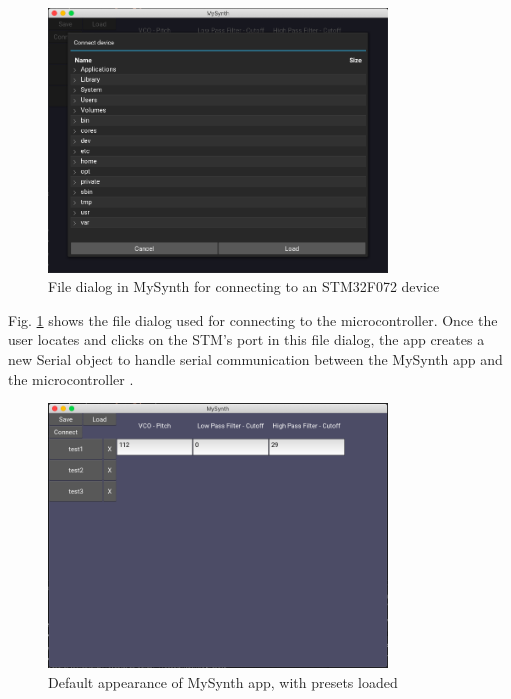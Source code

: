 \documentclass[letterpaper, 12 pt, conference]{ieeeconf}
\begin{document}
\begin{figure}[ht]
\includegraphics[width=9cm]{images/app_file_dialog.png}
\centering
\caption{File dialog in MySynth for connecting to an STM32F072 device}
\label{app_connect}
\end{figure}

Fig. \ref{app_connect} shows the file dialog used for connecting to the microcontroller. Once the user locates and clicks on the STM's port in this file dialog, the app creates a new Serial object to handle serial communication between the MySynth app and the microcontroller \cite{filechooser}.

\begin{figure}[ht]
\includegraphics[width=9cm]{images/app_main.png}
\center
\caption{Default appearance of MySynth app, with presets loaded}
\label{app_default}
\end{figure}
\end{document}
